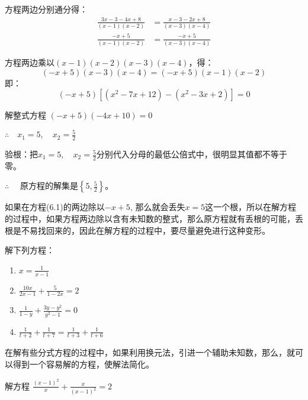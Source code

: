 \begin{solution}
    方程两边分别通分得：
\[\begin{split}
    \frac{3x-3-4x+8}{(x-1)(x-2)}&=\frac{x-3-2x+8}{(x-3)(x-4)}\\
    \frac{-x+5}{(x-1)(x-2)}&=\frac{-x+5}{(x-3)(x-4)}
\end{split}\]

方程两边乘以$(x-1)(x-2)(x-3)(x-4)$，得：
\begin{equation}
    (-x+5)(x-3)(x-4)=(-x+5)(x-1)(x-2)
\end{equation}
即：
\[(-x+5)[(x^2-7x+12)-(x^2-3x+2)]=0\]

解整式方程 $(-x+5)(-4x+10)=0$

$\therefore\quad x_1=5,\quad x_2=\frac{5}{2}$

验根：把$x_1=5,\quad x_2=\frac{5}{2}$分别代入分母的最低公倍式中，很明显其值都不等于零。

$\therefore\quad $ 原方程的解集是$\left\{5,\frac{5}{2}\right\}$。
\end{solution}

\begin{rmk}
  如果在方程(6.1)的两边除以$-x+5$, 那么就会丢失$x=5$这一个根，所以在解方程的过程中，如果方程两边除以含有未知数的整式，那么原方程就有丢根的可能，丢根是不易找回来的，因此在解方程的过程中，要尽量避免进行这种变形。    
\end{rmk}

\begin{ex}
解下列方程：
\begin{multicols}{2}
    \begin{enumerate}
        \item $x=\frac{1}{x-1}$
        \item $\frac{10x}{2x-1}+\frac{5}{1-2x}=2$
        \item $\frac{1}{1-y}+\frac{3y-y^2}{y^2-1}=0$
        \item $\frac{1}{t+2}+\frac{1}{t+7}=\frac{1}{t+3}+\frac{1}{t+6}$
    \end{enumerate}
\end{multicols}
\end{ex}

在解有些分式方程的过程中，如果利用换元法，引进一个辅助未知数，那么，就可以得到一个容易解的方程，使解法简化。


\begin{example}
解方程 $\frac{(x-1)^2}{x}+\frac{x}{(x-1)^2}=2$
\end{example}

